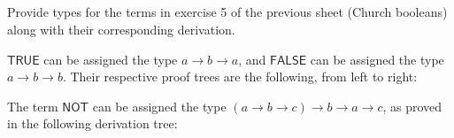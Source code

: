 \documentclass{article}
\begin{document}
\subsection{}\label{ex:4}

Provide types for the terms in exercise 5 of the previous sheet
(Church booleans) along with their corresponding derivation.

$\mathsf{TRUE}$ can be assigned the type $a \rightarrow b \rightarrow a$, 
and $\mathsf{FALSE}$ can be assigned the type $a \rightarrow b \rightarrow b$.
Their respective proof trees are the following, from left to right:

\begin{minipage}[t][3.3cm][t]{.3\textwidth}
\begin{mathpar}
\end{mathpar}
\end{minipage}
\hfill
\begin{minipage}[t]{.3\textwidth}
\begin{mathpar}
\end{mathpar}
\end{minipage}

The term $\mathsf{NOT}$ can be assigned the type 
$(a \rightarrow b \rightarrow c) \rightarrow b \rightarrow a 
\rightarrow c$, as proved in the following derivation tree:

\begin{mathpar}
\end{mathpar}
\end{document}
